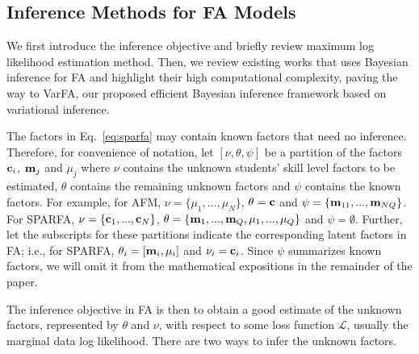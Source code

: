 \documentclass{edm_article}
\begin{document}
\subsection{Inference Methods for FA Models}
\label{sec:FA-inference}
We first introduce the inference objective and briefly review maximum log likelihood estimation method. Then, we review existing works that uses Bayesian inference for FA and highlight their high computational complexity, paving the way to VarFA, our proposed efficient Bayesian inference framework based on variational inference.

The factors in Eq.~\ref{eq:sparfa} may contain known factors that need no inference. Therefore, for convenience of notation, let $[\nu, \theta, \psi]$ be a partition of the factors ${\mathbf{c}}_i$, ${\mathbf{m}}_j$ and $\mu_j$ where $\nu$ contains the unknown students' skill level factors to be estimated, $\theta$ contains the remaining unknown factors and $\psi$ contains the known factors. For example, for AFM, $\nu = \{\mu_1,...,\mu_N \}$, $\theta={\mathbf{c}}$ and $\psi = \{{\mathbf{m}}_{11}, ..., {\mathbf{m}}_{NQ}\}$. For SPARFA, $\nu = \{{\mathbf{c}}_1,...,{\mathbf{c}}_N\}$, $\theta = \{{\mathbf{m}}_1, ...,{\mathbf{m}}_Q, \mu_1,...,\mu_Q\}$ and $\psi = \emptyset$. Further, let the subscripts for these partitions indicate the corresponding latent factors in FA; i.e., for SPARFA, $\theta_i = [{\mathbf{m}}_i, \mu_i]$ and $\nu_i = {\mathbf{c}}_i$. Since $\psi$ summarizes known factors, we will omit it from the mathematical expositions in the remainder of the paper.

The inference objective in FA is then to obtain a good estimate of the unknown factors, represented by $\theta$ and $\nu$, with respect to some loss function $\mathcal{L}$, usually the marginal data log likelihood. 
There are two ways to infer the unknown factors. 
\end{document}
